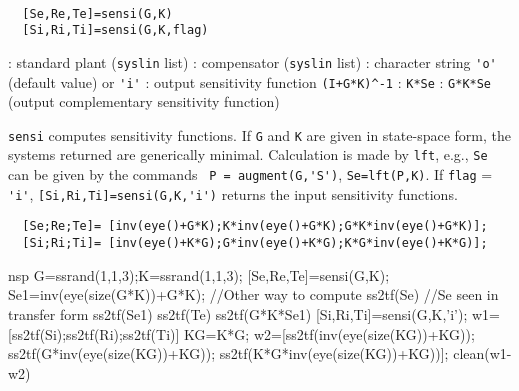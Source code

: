 \begin{mandesc}
   \\ %
\end{mandesc}
\begin{calling_sequence}
\begin{verbatim}
  [Se,Re,Te]=sensi(G,K)  
  [Si,Ri,Ti]=sensi(G,K,flag)  
\end{verbatim}
\end{calling_sequence}
\begin{parameters}
  \begin{varlist}
    : standard plant (\verb!syslin! list)
    : compensator (\verb!syslin! list)
    : character string \verb!'o'! (default value) or \verb!'i'!
    : output sensitivity function \verb!(I+G*K)^-1!
    : \verb!K*Se!
    : \verb!G*K*Se! (output complementary sensitivity function)
  \end{varlist}
\end{parameters}
\begin{mandescription}
  \verb!sensi! computes sensitivity functions. If \verb!G! and \verb!K! are
  given in state-space form, the systems returned are generically minimal. 
  Calculation is made by \verb!lft!, e.g., 
  \verb!Se! can be given by the commands 
  \verb! P = augment(G,'S')!, \verb!Se=lft(P,K)!.
  If \verb!flag! = \verb!'i'!, \verb![Si,Ri,Ti]=sensi(G,K,'i')!
  returns the input sensitivity functions.
\begin{verbatim}
  [Se;Re;Te]= [inv(eye()+G*K);K*inv(eye()+G*K);G*K*inv(eye()+G*K)];
  [Si;Ri;Ti]= [inv(eye()+K*G);G*inv(eye()+K*G);K*G*inv(eye()+K*G)];
\end{verbatim}
\end{mandescription}
\begin{examples}
  \begin{mintednsp}{nsp}
    G=ssrand(1,1,3);K=ssrand(1,1,3);
    [Se,Re,Te]=sensi(G,K);
    Se1=inv(eye(size(G*K))+G*K);  //Other way to compute
    ss2tf(Se)    //Se seen in transfer form
    ss2tf(Se1)
    ss2tf(Te)
    ss2tf(G*K*Se1)
    [Si,Ri,Ti]=sensi(G,K,'i');
    w1=[ss2tf(Si);ss2tf(Ri);ss2tf(Ti)]
    KG=K*G;
    w2=[ss2tf(inv(eye(size(KG))+KG));
        ss2tf(G*inv(eye(size(KG))+KG));
        ss2tf(K*G*inv(eye(size(KG))+KG))];
    clean(w1-w2)
  \end{mintednsp}
\end{examples}
\begin{manseealso}
      
\end{manseealso}
